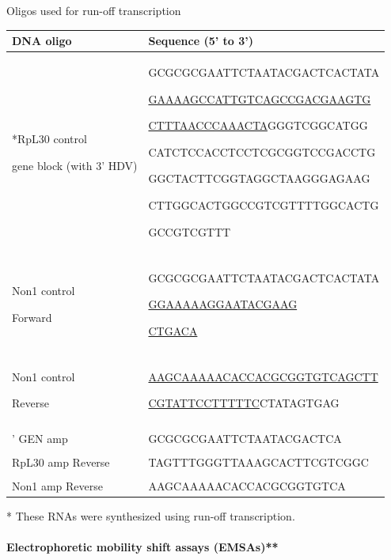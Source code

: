 \documentclass[12pt,oneside]{reedthesis}
\begin{document}
Oligos used for run-off transcription
\textbf{\hfill\break
}
\begin{longtable}[]{@{}
  >{\raggedright\arraybackslash}p{}
  >{\raggedright\arraybackslash}p{}@{}}
\toprule
\textbf{DNA oligo} & \textbf{Sequence (5' to 3')} \\
\midrule
\endhead
**RpL30 control

gene block (with 3' HDV) & GCGCGCGAATTCTAATACGACTCACTATA

\underline{GAAAAGCCATTGTCAGCCGACGAAGTG}

\underline{CTTTAACCCAAACTA}GGGTCGGCATGG

CATCTCCACCTCCTCGCGGTCCGACCTG

GGCTACTTCGGTAGGCTAAGGGAGAAG

CTTGGCACTGGCCGTCGTTTTGGCACTG

GCCGTCGTTT \\
& \\
Non1 control

Forward & GCGCGCGAATTCTAATACGACTCACTATA

\underline{GGAAAAAGGAATACGAAG}

\underline{CTGACA} \\
& \\
Non1 control

Reverse & \underline{AAGCAAAAACACCACGCGGTGTCAGCTT}

\underline{CGTATTCCTTTTTC}CTATAGTGAG \\
& \\
5' GEN amp & GCGCGCGAATTCTAATACGACTCA \\
& \\
RpL30 amp Reverse & TAGTTTGGGTTAAAGCACTTCGTCGGC \\
& \\
Non1 amp Reverse & AAGCAAAAACACCACGCGGTGTCA \\
\bottomrule
\end{longtable}
* These RNAs were synthesized using run-off transcription.


\hypertarget{electrophoretic-mobility-shift-assays-emsas}{%
\paragraph{Electrophoretic mobility shift assays (EMSAs)**}\label{electrophoretic-mobility-shift-assays-emsas}}
\end{document}
